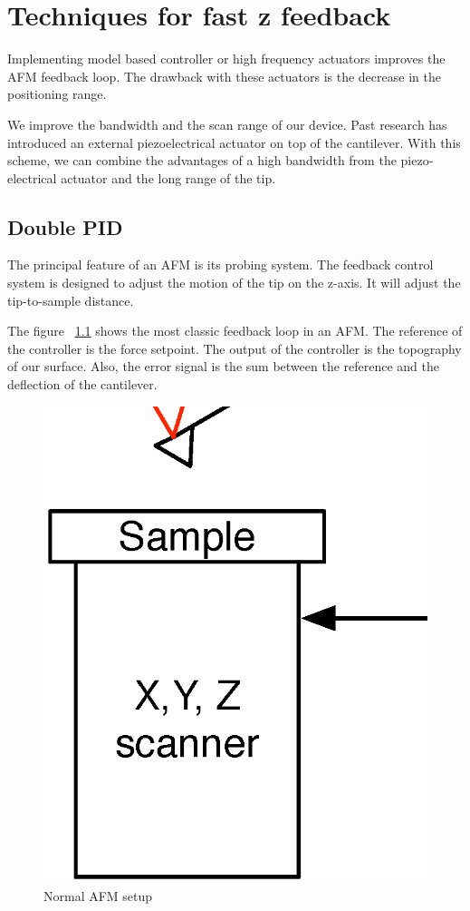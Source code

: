 \chapter{Techniques for fast z feedback}

Implementing model based controller or high frequency actuators improves the AFM feedback loop\cite{sulchek1999dual}. The drawback with these actuators is the decrease in the positioning range.

We improve the bandwidth and the scan range of our device. Past research has introduced an external piezoelectrical actuator on top of the cantilever. With this scheme, we can combine the advantages of a high bandwidth from the piezo-electrical actuator and the long range of the tip.

\section{Double PID}

The principal feature of an AFM is its probing system. The feedback control system is designed to adjust the motion of the tip on the z-axis. It will adjust the tip-to-sample distance. 

The figure ~\ref{fig:normalAFM} shows the most classic feedback loop in an AFM. The reference of the controller is the force setpoint. The output of the controller is the topography of our surface. Also, the error signal is the sum between the reference and the deflection of the cantilever.

\begin{figure}[!htb]
  \centering
  \includegraphics[scale=0.3]{images/normalafm.eps}
    \caption{Normal AFM setup}
  \label{fig:normalAFM}
\end{figure}

